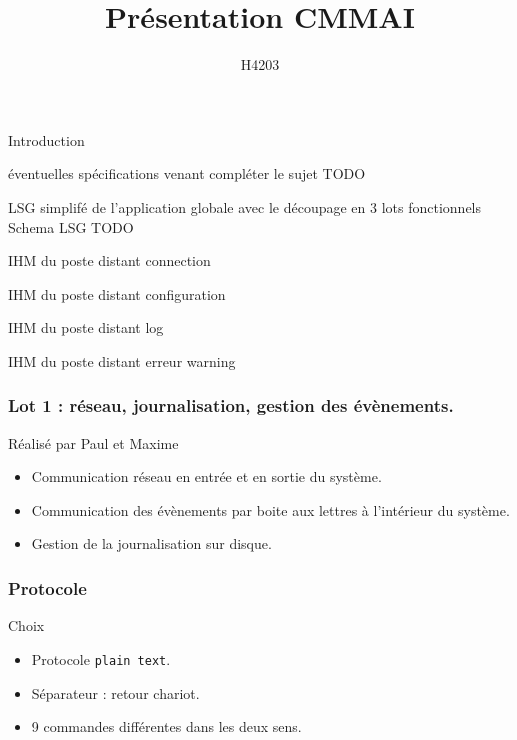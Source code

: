 \documentclass{beamer}
\title{Présentation CMMAI}
\author{H4203} %
\begin{document}
\begin{frame}
\titlepage
\end{frame}

\begin{frame}
Introduction
\end{frame}

\begin{frame}
éventuelles spécifications venant compléter le sujet
TODO
\end{frame}

\begin{frame}
LSG simplifé de l'application globale avec le découpage en 3 lots fonctionnels
Schema LSG TODO
\end{frame}

\begin{frame}
IHM du poste distant
connection
\end{frame}

\begin{frame}
IHM du poste distant
configuration
\end{frame}

\begin{frame}
IHM du poste distant
log
\end{frame}

\begin{frame}
IHM du poste distant
erreur \/ warning
\end{frame}

\begin{frame}
\frametitle{Lot 1 : réseau, journalisation, gestion des évènements.}
    \begin{block}{Réalisé par Paul et Maxime}
	\begin{itemize}
	    \item   Communication réseau en entrée et en sortie du système.
	    \item   Communication des évènements par boite aux lettres à
	    l'intérieur du système.
	    \item   Gestion de la journalisation sur disque.
	\end{itemize}
    \end{block}
\end{frame}

\begin{frame}
\frametitle{Protocole}
    \begin{block}{Choix}
	\begin{itemize}
	    \item Protocole \texttt{plain text}.
	    \item Séparateur : retour chariot.
	    \item 9 commandes différentes dans les deux sens.
	\end{itemize}
    \end{block}
\end{frame}
\end{document}
